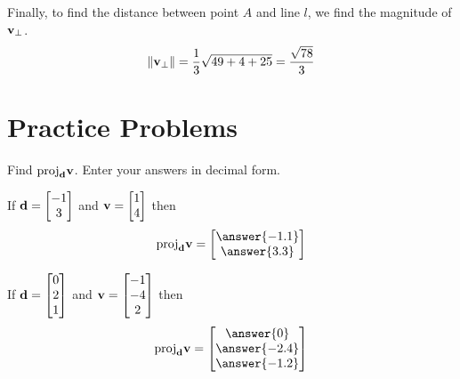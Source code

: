 \documentclass{ximera}
\renewcommand{\vec}[1]{{\bf #1}}
\newcommand{\norm}[1]{\left\lVert#1\right\rVert}
\begin{document}
\begin{example}
\begin{explanation}
\begin{image}[2in]
\end{image}


Finally, to find the distance between point $A$ and line $l$, we find the magnitude of $\vec{v}_{\perp}$.
$$\norm{\vec{v}_{\perp}}=\frac{1}{3}\sqrt{49+4+25}=\frac{\sqrt{78}}{3}$$
\end{explanation}
\end{example}

\section*{Practice Problems}
\begin{problem}
Find $\text{proj}_{\vec{d}}\vec{v}$.  Enter your answers in decimal form.
  \begin{problem}
  If $\vec{d}=\begin{bmatrix}-1\\3\end{bmatrix}$ and $\vec{v}=\begin{bmatrix}1\\4\end{bmatrix}$ then
  $$\text{proj}_{\vec{d}}\vec{v}=\begin{bmatrix}\answer{-1.1}\\\answer{3.3}\end{bmatrix}$$
    \end{problem}
    \begin{problem}
    If $\vec{d}=\begin{bmatrix}0\\2\\1\end{bmatrix}$ and $\vec{v}=\begin{bmatrix}-1\\-4\\2\end{bmatrix}$ then
    $$\text{proj}_{\vec{d}}\vec{v}=\begin{bmatrix}\answer{0}\\\answer{-2.4}\\\answer{-1.2}\end{bmatrix}$$
    \end{problem}
\end{problem}
\end{document}
